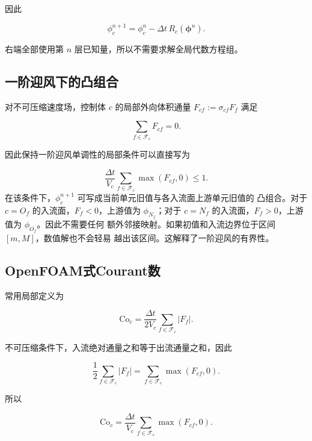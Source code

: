 \documentclass[UTF8,12pt,a4paper,fontset=fandol]{ctexart}
\numberwithin{equation}{section}
\newcommand{\Co}{\mathrm{Co}}
\begin{document}
因此

\begin{equation}
  \boxed{
  \phi_c^{n+1}
  =\phi_c^n-\Delta t\,R_c(\bm\phi^n)
  }.
  \label{eq:forward_euler}
\end{equation}

右端全部使用第 $n$ 层已知量，所以不需要求解全局代数方程组。

\subsection{一阶迎风下的凸组合}

对不可压缩速度场，控制体 $c$ 的局部外向体积通量
$F_{cf}:=\sigma_{cf}F_f$ 满足

\begin{equation}
  \sum_{f\in\mathcal F_c}F_{cf}=0.
\end{equation}

因此保持一阶迎风单调性的局部条件可以直接写为

\begin{equation}
  \boxed{
  \frac{\Delta t}{V_c}
  \sum_{f\in\mathcal F_c}\max(F_{cf},0)\leq1.}
\label{eq:convex_update}
\end{equation}
在该条件下，$\phi_c^{n+1}$ 可写成当前单元旧值与各入流面上游单元旧值的
凸组合。对于 $c=O_f$ 的入流面，$F_f<0$，上游值为 $\phi_{N_f}$；对于
$c=N_f$ 的入流面，$F_f>0$，上游值为 $\phi_{O_f}$。因此不需要任何
额外邻接映射。如果初值和入流边界位于区间 $[m,M]$，数值解也不会轻易
越出该区间。这解释了一阶迎风的有界性。

\subsection{OpenFOAM式Courant数}

常用局部定义为

\begin{equation}
  \Co_c
  =
  \frac{\Delta t}{2V_c}
  \sum_{f\in\mathcal F_c}|F_f|.
\end{equation}

不可压缩条件下，入流绝对通量之和等于出流通量之和，因此

\begin{equation}
  \frac12\sum_{f\in\mathcal F_c}|F_f|
  =
  \sum_{f\in\mathcal F_c}\max(F_{cf},0).
\end{equation}

所以

\begin{equation}
  \Co_c
  =
  \frac{\Delta t}{V_c}
  \sum_{f\in\mathcal F_c}\max(F_{cf},0).
\end{equation}
\end{document}
